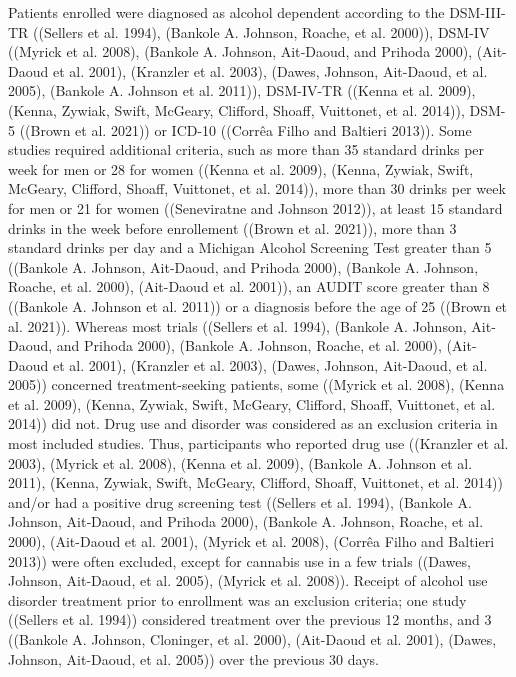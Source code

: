 \documentclass[
  12pt,
]{article}
\begin{document}
Patients enrolled were diagnosed as alcohol dependent according to the
DSM-III-TR ((Sellers et al. 1994), (Bankole A. Johnson, Roache, et al.
2000)), DSM-IV ((Myrick et al. 2008), (Bankole A. Johnson, Ait‐Daoud,
and Prihoda 2000), (Ait-Daoud et al. 2001), (Kranzler et al. 2003),
(Dawes, Johnson, Ait-Daoud, et al. 2005), (Bankole A. Johnson et al.
2011)), DSM-IV-TR ((Kenna et al. 2009), (Kenna, Zywiak, Swift, McGeary,
Clifford, Shoaff, Vuittonet, et al. 2014)), DSM-5 ((Brown et al. 2021))
or ICD-10 ((Corrêa Filho and Baltieri 2013)). Some studies required
additional criteria, such as more than 35 standard drinks per week for
men or 28 for women ((Kenna et al. 2009), (Kenna, Zywiak, Swift,
McGeary, Clifford, Shoaff, Vuittonet, et al. 2014)), more than 30 drinks
per week for men or 21 for women ((Seneviratne and Johnson 2012)), at
least 15 standard drinks in the week before enrollement ((Brown et al.
2021)), more than 3 standard drinks per day and a Michigan Alcohol
Screening Test greater than 5 ((Bankole A. Johnson, Ait‐Daoud, and
Prihoda 2000), (Bankole A. Johnson, Roache, et al. 2000), (Ait-Daoud et
al. 2001)), an AUDIT score greater than 8 ((Bankole A. Johnson et al.
2011)) or a diagnosis before the age of 25 ((Brown et al. 2021)).
Whereas most trials ((Sellers et al. 1994), (Bankole A. Johnson,
Ait‐Daoud, and Prihoda 2000), (Bankole A. Johnson, Roache, et al. 2000),
(Ait-Daoud et al. 2001), (Kranzler et al. 2003), (Dawes, Johnson,
Ait-Daoud, et al. 2005)) concerned treatment-seeking patients, some
((Myrick et al. 2008), (Kenna et al. 2009), (Kenna, Zywiak, Swift,
McGeary, Clifford, Shoaff, Vuittonet, et al. 2014)) did not. Drug use
and disorder was considered as an exclusion criteria in most included
studies. Thus, participants who reported drug use ((Kranzler et al.
2003), (Myrick et al. 2008), (Kenna et al. 2009), (Bankole A. Johnson et
al. 2011), (Kenna, Zywiak, Swift, McGeary, Clifford, Shoaff, Vuittonet,
et al. 2014)) and/or had a positive drug screening test ((Sellers et al.
1994), (Bankole A. Johnson, Ait‐Daoud, and Prihoda 2000), (Bankole A.
Johnson, Roache, et al. 2000), (Ait-Daoud et al. 2001), (Myrick et al.
2008), (Corrêa Filho and Baltieri 2013)) were often excluded, except for
cannabis use in a few trials ((Dawes, Johnson, Ait-Daoud, et al. 2005),
(Myrick et al. 2008)). Receipt of alcohol use disorder treatment prior
to enrollment was an exclusion criteria; one study ((Sellers et al.
1994)) considered treatment over the previous 12 months, and 3 ((Bankole
A. Johnson, Cloninger, et al. 2000), (Ait-Daoud et al. 2001), (Dawes,
Johnson, Ait-Daoud, et al. 2005)) over the previous 30 days.
\end{document}
